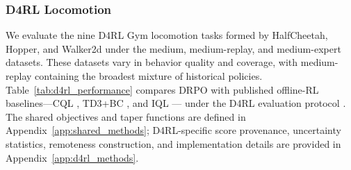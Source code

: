 \documentclass{article}
\theoremstyle{plain}
\theoremstyle{definition}
\theoremstyle{remark}
\begin{document}

\subsubsection{D4RL Locomotion}
\label{sec:d4rl_performance}

We evaluate the nine D4RL Gym locomotion tasks formed by HalfCheetah,
Hopper, and Walker2d under the medium, medium-replay, and medium-expert
datasets. These datasets vary in behavior quality and coverage, with
medium-replay containing the broadest mixture of historical policies.
Table~\ref{tab:d4rl_performance} compares DRPO with published offline-RL
baselines---CQL \citep{kumar2020conservative}, TD3+BC
\citep{fujimoto2021minimalist}, and IQL \citep{kostrikov2021offline}---%
under the D4RL evaluation protocol \citep{fu2020d4rl,todorov2012mujoco}. The shared objectives and
taper functions are defined in Appendix~\ref{app:shared_methods};
D4RL-specific score provenance, uncertainty statistics, remoteness
construction, and implementation details are provided in
Appendix~\ref{app:d4rl_methods}.
\end{document}
